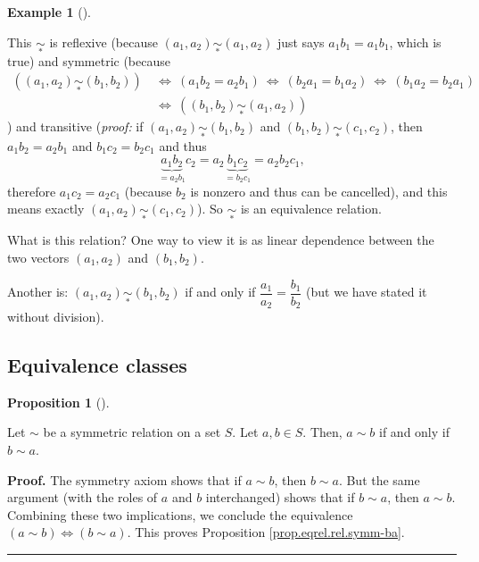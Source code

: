 \documentclass[numbers=enddot,12pt,final,onecolumn,notitlepage]{scrartcl}%
\numberwithin{exer}{subsection}
\theoremstyle{definition}
\newtheorem{prop}[theo]{Proposition}
\newenvironment{proposition}[1][]
{\begin{prop}[#1]\begin{leftbar}}
{\end{leftbar}\end{prop}}
\newtheorem{exam}[theo]{Example}
\newenvironment{example}[1][]
{\begin{exam}[#1]\begin{leftbar}}
{\end{leftbar}\end{exam}}
\newenvironment{proof}[1][Proof]{\noindent\textbf{#1.} }{\ \rule{0.5em}{0.5em}}
\begin{document}
\begin{example}
This $\underset{\ast}{\sim}$ is reflexive (because $\left(  a_{1}%
,a_{2}\right)  \underset{\ast}{\sim}\left(  a_{1},a_{2}\right)  $ just says
$a_{1}b_{1}=a_{1}b_{1}$, which is true) and symmetric (because
\begin{align*}
\left(  \left(  a_{1},a_{2}\right)  \underset{\ast}{\sim}\left(  b_{1}%
,b_{2}\right)  \right)  \  &  \Longleftrightarrow\ \left(  a_{1}b_{2}%
=a_{2}b_{1}\right)  \ \Longleftrightarrow\ \left(  b_{2}a_{1}=b_{1}%
a_{2}\right)  \ \Longleftrightarrow\ \left(  b_{1}a_{2}=b_{2}a_{1}\right) \\
&  \Longleftrightarrow\ \left(  \left(  b_{1},b_{2}\right)  \underset{\ast
}{\sim}\left(  a_{1},a_{2}\right)  \right)
\end{align*}
) and transitive (\textit{proof:} if $\left(  a_{1},a_{2}\right)
\underset{\ast}{\sim}\left(  b_{1},b_{2}\right)  $ and $\left(  b_{1}%
,b_{2}\right)  \underset{\ast}{\sim}\left(  c_{1},c_{2}\right)  $, then
$a_{1}b_{2}=a_{2}b_{1}$ and $b_{1}c_{2}=b_{2}c_{1}$ and thus%
\[
\underbrace{a_{1}b_{2}}_{=a_{2}b_{1}}c_{2}=a_{2}\underbrace{b_{1}c_{2}%
}_{=b_{2}c_{1}}=a_{2}b_{2}c_{1},
\]
therefore $a_{1}c_{2}=a_{2}c_{1}$ (because $b_{2}$ is nonzero and thus can be
cancelled), and this means exactly $\left(  a_{1},a_{2}\right)  \underset{\ast
}{\sim}\left(  c_{1},c_{2}\right)  $). So $\underset{\ast}{\sim}$ is an
equivalence relation.

What is this relation? One way to view it is as linear dependence between the
two vectors $\left(  a_{1},a_{2}\right)  $ and $\left(  b_{1},b_{2}\right)  $.

Another is: $\left(  a_{1},a_{2}\right)  \underset{\ast}{\sim}\left(
b_{1},b_{2}\right)  $ if and only if $\dfrac{a_{1}}{a_{2}}=\dfrac{b_{1}}%
{b_{2}}$ (but we have stated it without division).
\end{example}

\subsection{Equivalence classes}

\begin{proposition}
\label{prop.eqrel.rel.symm-ba}Let $\sim$ be a symmetric relation on a set $S$.
Let $a,b\in S$. Then, $a\sim b$ if and only if $b\sim a$.
\end{proposition}

\begin{proof}
The symmetry axiom shows that if $a\sim b$, then $b\sim a$. But the same
argument (with the roles of $a$ and $b$ interchanged) shows that if $b\sim a$,
then $a\sim b$. Combining these two implications, we conclude the equivalence
$\left(  a\sim b\right)  \Longleftrightarrow\left(  b\sim a\right)  $. This
proves Proposition \ref{prop.eqrel.rel.symm-ba}.
\end{proof}
\end{document}
